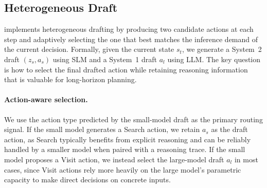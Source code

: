 \subsection{Heterogeneous Draft}
\label{subsec:hetero_draft}


\method{} implements heterogeneous drafting by producing two candidate actions at each step and adaptively selecting the one that best matches the inference demand of the current decision.
Formally, given the current state $s_t$, we generate a System~2 draft $(z_s, a_s)$ using SLM and
a System~1 draft $a_l$ using LLM.
The key question is how to select the final drafted action while retaining reasoning information that is valuable for long-horizon planning.


\paragraph{Action-aware selection.}
We use the action type predicted by the small-model draft as the primary routing signal.
If the small model generates a Search action, we retain $a_s$ as the draft action, as Search typically benefits from explicit reasoning and can be reliably handled by a smaller model when paired with a reasoning trace.
If the small model proposes a Visit action, we instead select the large-model draft $a_l$ in most cases, since Visit actions rely more heavily on the large model's parametric capacity to make direct decisions on concrete inputs.

